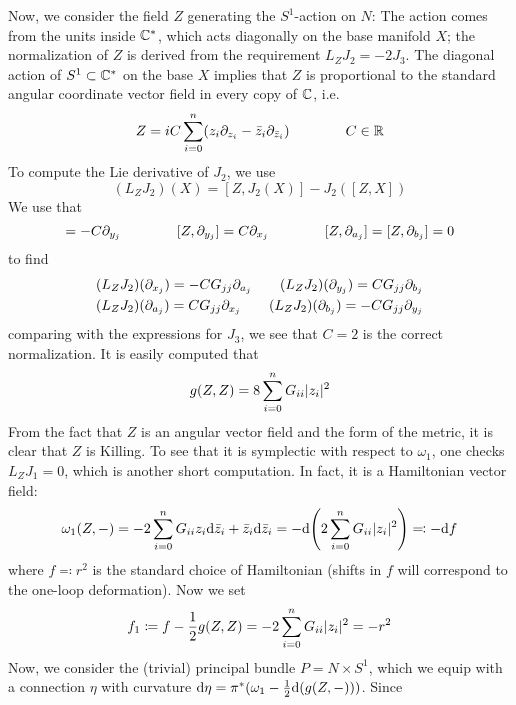 Now, we consider the field $Z$ generating the $S^1$-action on $N$: The action comes from the units inside $\mathbb{C}^*$, which acts diagonally on the base manifold $X$; the normalization of $Z$ is derived from the requirement $L_Z J_2=-2J_3$. The diagonal action of $S^1\subset \mathbb{C}^*$ on the base $X$ implies that $Z$ is proportional to the standard angular coordinate vector field in every copy of $\mathbb{C}$, i.e.
\begin{equation*}
	Z= iC\sum_{i=0}^n (z_i \partial_{z_i}-\bar z_i \partial_{\bar z_i}) \qquad \qquad C\in \mathbb{R}
\end{equation*}
To compute the Lie derivative of $J_2$, we use
\begin{equation*}
	(L_ZJ_2)(X)=[Z,J_2(X)]-J_2([Z,X])
\end{equation*}
We use that
\begin{equation*}
	[Z,\p_{x_j}]=-C\p_{y_j} \qquad \qquad [Z,\p_{y_j}]=C\p_{x_j} \qquad \qquad [Z,\p_{a_j}]=[Z,\p_{b_j}]=0
\end{equation*}
to find
\begin{gather*}
	(L_ZJ_2)(\partial_{x_j})=-CG_{jj}\partial_{a_j} \qquad 
	(L_ZJ_2)(\partial_{y_j})=CG_{jj}\partial_{b_j} \\
	(L_ZJ_2)(\partial_{a_j})=CG_{jj}\partial_{x_j} \qquad
	(L_ZJ_2)(\partial_{b_j})=-CG_{jj}\partial_{y_j}
\end{gather*}
comparing with the expressions for $J_3$, we see that $C=2$ is the correct normalization. It is easily computed that
\begin{equation*}
	g(Z,Z)=8\sum_{i=0}^n G_{ii}\lvert z_i \rvert^2
\end{equation*}
From the fact that $Z$ is an angular vector field and the form of the metric, it is clear that $Z$ is Killing. To see that it is symplectic with respect to $\omega_1$, one checks $L_ZJ_1=0$, which is another short computation. In fact, it is a Hamiltonian vector field:
\begin{equation}
	\omega_1(Z,-)=-2\sum_{i=0}^n G_{ii}z_i \mathrm{d} \bar z_i+\bar z_i \mathrm{d} \bar z_i
	=-\mathrm{d}\Bigg(2\sum_{i=0}^n G_{ii} \lvert z_i \rvert^2\Bigg)\eqqcolon -\mathrm{d} f
\end{equation}
where $f\eqqcolon r^2$ is the standard choice of Hamiltonian (shifts in $f$ will correspond to the one-loop deformation). Now we set
\begin{equation*}
	f_1\coloneqq f-\frac{1}{2}g(Z,Z)=-2\sum_{i=0}^n G_{ii} \lvert z_i \rvert^2=-r^2
\end{equation*}
Now, we consider the (trivial) principal bundle $P=N\times S^1$, which we equip with a connection $\eta$ with curvature $\mathrm{d}\eta=\pi^*(\omega_1-\frac{1}{2}\mathrm{d} (g(Z,-)))$. Since
